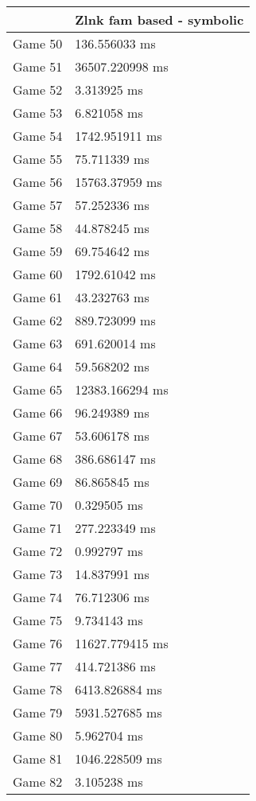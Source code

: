 \begin{tabular}{|l|l|}
	\hline
	& Zlnk fam based - symbolic \\ \hline
	Game 50 & 136.556033 ms \\ \hline
	Game 51 & 36507.220998 ms \\ \hline
	Game 52 & 3.313925 ms \\ \hline
	Game 53 & 6.821058 ms \\ \hline
	Game 54 & 1742.951911 ms \\ \hline
	Game 55 & 75.711339 ms \\ \hline
	Game 56 & 15763.37959 ms \\ \hline
	Game 57 & 57.252336 ms \\ \hline
	Game 58 & 44.878245 ms \\ \hline
	Game 59 & 69.754642 ms \\ \hline
	Game 60 & 1792.61042 ms \\ \hline
	Game 61 & 43.232763 ms \\ \hline
	Game 62 & 889.723099 ms \\ \hline
	Game 63 & 691.620014 ms \\ \hline
	Game 64 & 59.568202 ms \\ \hline
	Game 65 & 12383.166294 ms \\ \hline
	Game 66 & 96.249389 ms \\ \hline
	Game 67 & 53.606178 ms \\ \hline
	Game 68 & 386.686147 ms \\ \hline
	Game 69 & 86.865845 ms \\ \hline
	Game 70 & 0.329505 ms \\ \hline
	Game 71 & 277.223349 ms \\ \hline
	Game 72 & 0.992797 ms \\ \hline
	Game 73 & 14.837991 ms \\ \hline
	Game 74 & 76.712306 ms \\ \hline
	Game 75 & 9.734143 ms \\ \hline
	Game 76 & 11627.779415 ms \\ \hline
	Game 77 & 414.721386 ms \\ \hline
	Game 78 & 6413.826884 ms \\ \hline
	Game 79 & 5931.527685 ms \\ \hline
	Game 80 & 5.962704 ms \\ \hline
	Game 81 & 1046.228509 ms \\ \hline
	Game 82 & 3.105238 ms \\ \hline

\end{tabular}
